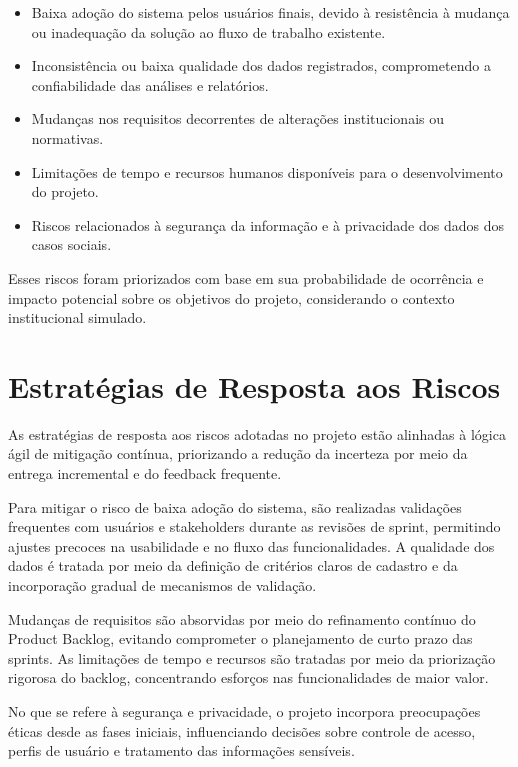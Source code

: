 \begin{itemize}
    \item Baixa adoção do sistema pelos usuários finais, devido à resistência à mudança ou inadequação da solução ao fluxo de trabalho existente.
    \item Inconsistência ou baixa qualidade dos dados registrados, comprometendo a confiabilidade das análises e relatórios.
    \item Mudanças nos requisitos decorrentes de alterações institucionais ou normativas.
    \item Limitações de tempo e recursos humanos disponíveis para o desenvolvimento do projeto.
    \item Riscos relacionados à segurança da informação e à privacidade dos dados dos casos sociais.
\end{itemize}

Esses riscos foram priorizados com base em sua probabilidade de ocorrência e impacto potencial sobre os objetivos do projeto, considerando o contexto institucional simulado.

\section{Estratégias de Resposta aos Riscos}

As estratégias de resposta aos riscos adotadas no projeto estão alinhadas à lógica ágil de mitigação contínua, priorizando a redução da incerteza por meio da entrega incremental e do feedback frequente.

Para mitigar o risco de baixa adoção do sistema, são realizadas validações frequentes com usuários e stakeholders durante as revisões de sprint, permitindo ajustes precoces na usabilidade e no fluxo das funcionalidades. A qualidade dos dados é tratada por meio da definição de critérios claros de cadastro e da incorporação gradual de mecanismos de validação.

Mudanças de requisitos são absorvidas por meio do refinamento contínuo do Product Backlog, evitando comprometer o planejamento de curto prazo das sprints. As limitações de tempo e recursos são tratadas por meio da priorização rigorosa do backlog, concentrando esforços nas funcionalidades de maior valor.

No que se refere à segurança e privacidade, o projeto incorpora preocupações éticas desde as fases iniciais, influenciando decisões sobre controle de acesso, perfis de usuário e tratamento das informações sensíveis.

